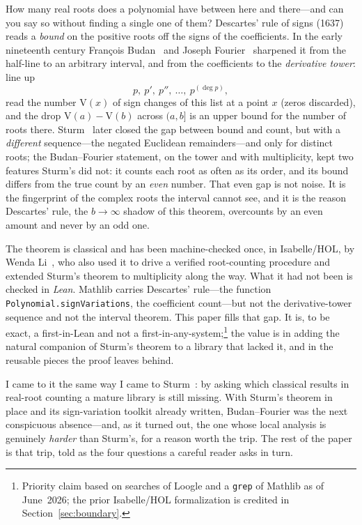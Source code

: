 \documentclass[11pt]{article}
\newcommand{\lean}[1]{\texttt{#1}}
\newcommand{\V}{\mathrm{V}}
\begin{document}
How many real roots does a polynomial have between here and there---and can you say so without
finding a single one of them? Descartes' rule of signs (1637)~\cite{descartes} reads a \emph{bound}
on the positive roots off the signs of the coefficients. In the early nineteenth century Fran\c{c}ois
Budan~\cite{budan} and Joseph Fourier~\cite{fourier} sharpened it from the half-line to an arbitrary
interval, and from the coefficients to the \emph{derivative tower}: line up
\[
  p,\ p',\ p'',\ \dots,\ p^{(\deg p)},
\]
read the number $\V(x)$ of sign changes of this list at a point $x$ (zeros discarded), and the drop
$\V(a)-\V(b)$ across $(a,b]$ is an upper bound for the number of roots there. Sturm~\cite{sturm}
later closed the gap between bound and count, but with a \emph{different} sequence---the negated
Euclidean remainders---and only for distinct roots; the Budan--Fourier statement, on the tower and
with multiplicity, kept two features Sturm's did not: it counts each root as often as its order, and
its bound differs from the true count by an \emph{even} number. That even gap is not noise. It is the
fingerprint of the complex roots the interval cannot see, and it is the reason Descartes' rule, the
$b\to\infty$ shadow of this theorem, overcounts by an even amount and never by an odd one.

The theorem is classical and has been machine-checked once, in Isabelle/HOL, by Wenda
Li~\cite{liBF}, who also used it to drive a verified root-counting procedure and extended Sturm's
theorem to multiplicity along the way. What it had not been is checked in \emph{Lean}. Mathlib carries
Descartes' rule---the function \lean{Polynomial.signVariations}, the coefficient count---but not the
derivative-tower sequence and not the interval theorem. This paper fills that gap. It is, to be exact,
a first-in-Lean and not a first-in-any-system;\footnote{Priority claim based on searches of Loogle
and a \lean{grep} of Mathlib as of June~2026; the prior Isabelle/HOL formalization is credited in
Section~\ref{sec:boundary}.} the value is in adding the natural companion of Sturm's theorem to a
library that lacked it, and in the reusable pieces the proof leaves behind.

I came to it the same way I came to Sturm~\cite{sturmlean}: by asking which classical results in
real-root counting a mature library is still missing. With Sturm's theorem in place and its
sign-variation toolkit already written, Budan--Fourier was the next conspicuous absence---and, as it
turned out, the one whose local analysis is genuinely \emph{harder} than Sturm's, for a reason worth
the trip. The rest of the paper is that trip, told as the four questions a careful reader asks in
turn.
\end{document}
